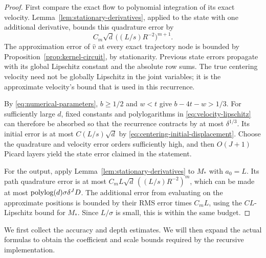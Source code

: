 \begin{proof}
First compare the exact flow to polynomial integration of its exact
velocity.  Lemma~\ref{lem:stationary-derivatives}, applied to the state
with one additional derivative, bounds this quadrature error by
\[
 C_m\sqrt d\,\bigl((L/s)R^{-2}\bigr)^{m+1}.
\]
The approximation error of $\widehat v$ at every exact trajectory
node is bounded by Proposition~\ref{prop:kernel-circuit}, by
stationarity.  Previous state errors propagate with its global
Lipschitz constant and the absolute row sums.  The true centering
velocity need not be globally Lipschitz in the joint variables; it is
the approximate velocity's bound that is used in this recurrence.

By \eqref{eq:numerical-parameters}, $b\ge1/2$ and $w<t$ give
$b-4t-w>1/3$.  For sufficiently large $d$, fixed constants and
polylogarithms in \eqref{eq:velocity-lipschitz} can therefore be
absorbed so that the recurrence contracts by at most $\delta^{1/3}$.
Its initial error is at most $C(L/s)\sqrt d$ by
\eqref{eq:centering-initial-displacement}.  Choose the quadrature and
velocity error orders sufficiently high, and then $O(J+1)$ Picard
layers yield the state error claimed in the statement.

For the output, apply Lemma~\ref{lem:stationary-derivatives} to $M_*$
with $a_0=L$.  Its path quadrature error is at most
$C_mL\sqrt d\,((L/s)R^{-2})^m$, which can be made at most
$\operatorname{polylog}(d)\sigma\delta^JD$.  The additional error from evaluating
on the approximate positions is bounded by their RMS error times
$C_mL$, using the $CL$-Lipschitz bound for $M_*$.  Since $L/\sigma$
is small, this is within the same budget.
\end{proof}

We first collect the accuracy and depth estimates.  We will then expand
the actual formulas to obtain the coefficient and scale bounds required
by the recursive implementation.

